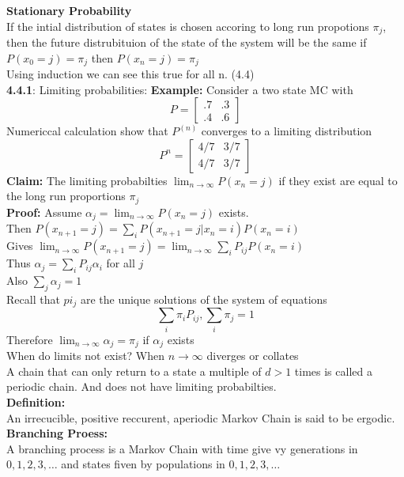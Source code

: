 \documentclass{article}
\begin{document}
\textbf{Stationary Probability}\\
If the intial distribution of states is chosen accoring to long run propotions $\pi_j$, then the future distrubituion of the state of the system will be the same if $P(x_0 = j) = \pi_j$ then $P(x_n = j) = \pi_j$\\
Using induction we can see this true for all n. (4.4)\\

\textbf{4.4.1}:
Limiting probabilities: 
\textbf{Example: } Consider a two state MC with $$P = \begin{bmatrix}
    .7 & .3 \\
    .4 & .6
\end{bmatrix}$$
Numericcal calculation show that $P^{(n)}$ converges to a limiting distribution $$P^n = \begin{bmatrix}
    4/7 & 3/7 \\
    4/7 & 3/7
\end{bmatrix}
$$
\textbf{Claim: } The limiting probabilties $\lim_{n \rightarrow \infty} P(x_n = j) $ if they exist are equal to the long run proportions $\pi_j$\\
\textbf{Proof:} Assume $\alpha_j = \lim_{n \to \infty} P(x_n = j)$ exists.\\
Then $P(x_{n+1} = j) = \sum_{i} P(x_{n+1} = j | x_n = i) P(x_n = i)$\\
Gives $\lim_{n \to \infty} P(x_{n+1} = j) = \lim_{n \to \infty} \sum_{i} P_{ij} P(x_n = i)$\\
Thus $\alpha_j = \sum_{i} P_{ij} \alpha_i$ for all $j$\\
Also $\sum_{j} \alpha_j = 1$\\
Recall that $pi_j$ are the unique solutions of the system of equations $$\sum_{i} \pi_i P_{ij}, \sum_{i}\pi_j = 1$$
Therefore $\lim_{n \rightarrow \infty }\alpha_j = \pi_j$ if $\alpha_j$ exists \\
When do limits not exist? When $n \rightarrow \infty$ diverges or collates \\
A chain that can only return to a state a multiple of $d>1$ times is called a periodic chain. And does not have limiting probabilties.\\
\textbf{Definition: }\\
An irrecucible, positive reccurent, aperiodic Markov Chain is said to be ergodic.\\
\textbf{Branching Proess:}\\
A branching process is a Markov Chain with time give vy generations in $0,1,2,3, \dots$ and states fiven by populations in $0,1,2,3, \dots$\\
\end{document}
